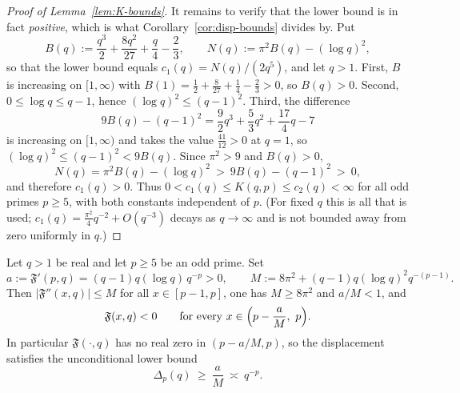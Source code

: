 \begin{proof}[Proof of Lemma~\ref{lem:K-bounds}]
It remains to verify that the lower bound is in fact \emph{positive}, which is what
Corollary~\ref{cor:disp-bounds} divides by. Put
\[
B(q):=\frac{q^3}{2}+\frac{8q^2}{27}+\frac{q}{4}-\frac23,
\qquad
N(q):=\pi^2B(q)-(\log q)^2 ,
\]
so that the lower bound equals $c_1(q)=N(q)/(2q^5)$, and let $q>1$. First, $B$ is increasing on
$[1,\infty)$ with $B(1)=\tfrac12+\tfrac8{27}+\tfrac14-\tfrac23>0$, so $B(q)>0$. Second,
$0\le\log q\le q-1$, hence $(\log q)^2\le(q-1)^2$. Third, the difference
\[
9B(q)-(q-1)^2=\frac92q^3+\frac53q^2+\frac{17}{4}q-7
\]
is increasing on $[1,\infty)$ and takes the value $\tfrac{41}{12}>0$ at $q=1$, so
$(\log q)^2\le(q-1)^2<9B(q)$. Since $\pi^2>9$ and $B(q)>0$,
\[
N(q)=\pi^2B(q)-(\log q)^2\ >\ 9B(q)-(q-1)^2\ >\ 0 ,
\]
and therefore $c_1(q)>0$. Thus $0<c_1(q)\le K(q,p)\le c_2(q)<\infty$ for all odd primes
$p\ge5$, with both constants independent of $p$. (For fixed $q$ this is all that is used;
$c_1(q)=\tfrac{\pi^2}{4}q^{-2}+O(q^{-3})$ decays as $q\to\infty$ and is not bounded away from
zero uniformly in $q$.)
\end{proof}

\begin{lemma}\label{lem:zero-free-window}
Let $q>1$ be real and let $p\ge5$ be an odd prime. Set
\[
a:=\mathfrak F'(p,q)=(q-1)q(\log q)\,q^{-p}>0,
\qquad
M:=8\pi^2+(q-1)q(\log q)^2q^{-(p-1)} .
\]
Then $|\mathfrak F''(x,q)|\le M$ for all $x\in[p-1,p]$, one has $M\ge8\pi^2$ and $a/M<1$, and
\[
\mathfrak F(x,q)<0\qquad\text{for every }x\in\Bigl(p-\frac aM,\ p\Bigr).
\]
In particular $\mathfrak F(\cdot,q)$ has no real zero in $(p-a/M,p)$, so the displacement
satisfies the unconditional lower bound
\[
\Delta_p(q)\ \ge\ \frac aM\ \asymp\ q^{-p}.
\]
\end{lemma}

